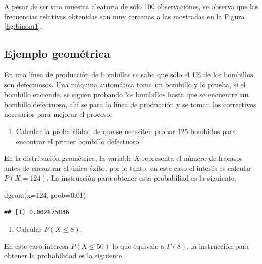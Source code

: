 \documentclass[
]{book}
\makeatletter
\newenvironment{Shaded}{\begin{snugshade}}{\end{snugshade}}
\newcommand{\AttributeTok}[1]{\textcolor[rgb]{0.77,0.63,0.00}{#1}}
\newcommand{\DecValTok}[1]{\textcolor[rgb]{0.00,0.00,0.81}{#1}}
\newcommand{\FloatTok}[1]{\textcolor[rgb]{0.00,0.00,0.81}{#1}}
\newcommand{\FunctionTok}[1]{\textcolor[rgb]{0.00,0.00,0.00}{#1}}
\newcommand{\NormalTok}[1]{#1}
\providecommand{\tightlist}{%
  \setlength{\itemsep}{0pt}\setlength{\parskip}{0pt}}
\newenvironment{kframe}{%
\medskip{}
\setlength{\fboxsep}{.8em}
 \def\at@end@of@kframe{}%
 \ifinner\ifhmode%
  \def\at@end@of@kframe{\end{minipage}}%
  \begin{minipage}{\columnwidth}%
 \fi\fi%
 \def\FrameCommand##1{\hskip\@totalleftmargin \hskip-\fboxsep
 \colorbox{shadecolor}{##1}\hskip-\fboxsep
     \hskip-\linewidth \hskip-\@totalleftmargin \hskip\columnwidth}%
 \MakeFramed {\advance\hsize-\width
   \@totalleftmargin\z@ \linewidth\hsize
   \@setminipage}}%
 {\par\unskip\endMakeFramed%
 \at@end@of@kframe}
\renewenvironment{Shaded}{\begin{kframe}}{\end{kframe}}
\makeatother
\begin{document}
A pesar de ser una muestra aleatoria de sólo 100 observaciones, se observa que las frecuencias relativas obtenidas son muy cercanas a las mostradas en la Figura \ref{fig:binom1}.

\hypertarget{ejemplo-geomuxe9trica}{%
\subsection*{Ejemplo geométrica}\label{ejemplo-geomuxe9trica}}

En una línea de producción de bombillos se sabe que sólo el 1\% de los bombillos son defectuosos. Una máquina automática toma un bombillo y lo prueba, si el bombillo enciende, se siguen probando los bombillos hasta que se encuentre \textbf{un} bombillo defectuoso, ahí se para la línea de producción y se toman los correctivos necesarios para mejorar el proceso.

\begin{enumerate}
\def\labelenumi{\arabic{enumi})}
\tightlist
\item
  Calcular la probabilidad de que se necesiten probar 125 bombillos para encontrar el primer bombillo defectuoso.
\end{enumerate}

En la distribución geométrica, la variable \(X\) representa el número de fracasos antes de encontrar el único éxito, por lo tanto, en este caso el interés es calcular \(P(X=124)\). La instrucción para obtener esta probabiliad es la siguiente.

\begin{Shaded}
\begin{Highlighting}[]
\FunctionTok{dgeom}\NormalTok{(}\AttributeTok{x=}\DecValTok{124}\NormalTok{, }\AttributeTok{prob=}\FloatTok{0.01}\NormalTok{)}
\end{Highlighting}
\end{Shaded}

\begin{verbatim}
## [1] 0.002875836
\end{verbatim}

\begin{enumerate}
\def\labelenumi{\arabic{enumi})}
\setcounter{enumi}{1}
\tightlist
\item
  Calcular \(P(X \leq 8)\).
\end{enumerate}

En este caso interesa \(P(X \leq 50)\) lo que equivale a \(F(8)\), la instrucción para obtener la probabilidad es la siguiente.
\end{document}
